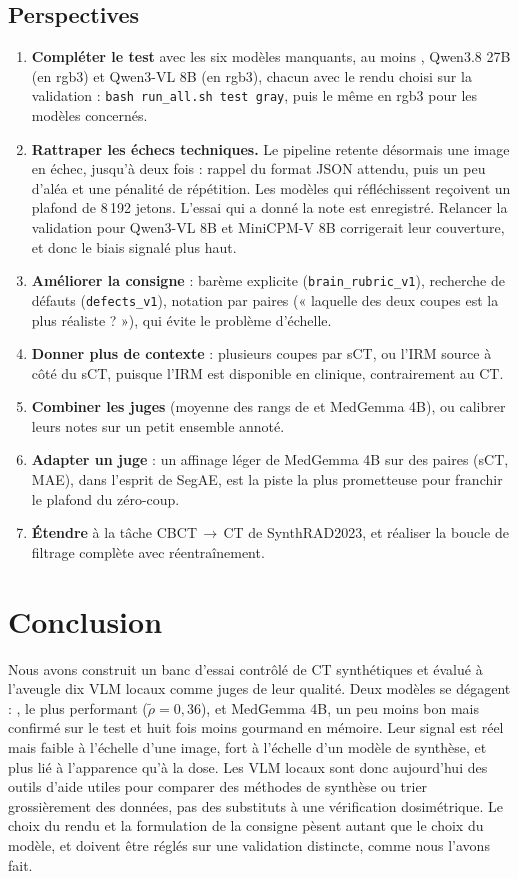 \documentclass[11pt,a4paper]{article}
\newcommand{\rhot}{\tilde{\rho}}
\begin{document}
\subsection{Perspectives}
\label{sec:perspectives}
\begin{enumerate}
  \item \textbf{Compléter le test} avec les six modèles manquants, au moins \bestVal{}, Qwen3.8 27B (en rgb3) et Qwen3-VL 8B (en rgb3), chacun avec le rendu choisi sur la validation : \texttt{bash run\_all.sh test gray}, puis le même en rgb3 pour les modèles concernés.
  \item \textbf{Rattraper les échecs techniques.} Le pipeline retente désormais une image en échec, jusqu'à deux fois : rappel du format JSON attendu, puis un peu d'aléa et une pénalité de répétition. Les modèles qui réfléchissent reçoivent un plafond de 8\,192 jetons. L'essai qui a donné la note est enregistré. Relancer la validation pour Qwen3-VL 8B et MiniCPM-V 8B corrigerait leur couverture, et donc le biais signalé plus haut.
  \item \textbf{Améliorer la consigne} : barème explicite (\texttt{brain\_rubric\_v1}), recherche de défauts (\texttt{defects\_v1}), notation par paires (« laquelle des deux coupes est la plus réaliste ? »), qui évite le problème d'échelle.
  \item \textbf{Donner plus de contexte} : plusieurs coupes par sCT, ou l'IRM source à côté du sCT, puisque l'IRM est disponible en clinique, contrairement au CT.
  \item \textbf{Combiner les juges} (moyenne des rangs de \bestVal{} et MedGemma 4B), ou calibrer leurs notes sur un petit ensemble annoté.
  \item \textbf{Adapter un juge} : un affinage léger de MedGemma 4B sur des paires (sCT, MAE), dans l'esprit de SegAE, est la piste la plus prometteuse pour franchir le plafond du zéro-coup.
  \item \textbf{Étendre} à la tâche CBCT\,$\rightarrow$\,CT de SynthRAD2023, et réaliser la boucle de filtrage complète avec réentraînement.
\end{enumerate}

\section{Conclusion}
Nous avons construit un banc d'essai contrôlé de CT synthétiques et évalué à l'aveugle dix VLM locaux comme juges de leur qualité. Deux modèles se dégagent : \bestVal{}, le plus performant ($\rhot = 0{,}36$), et MedGemma 4B, un peu moins bon mais confirmé sur le test et huit fois moins gourmand en mémoire. Leur signal est réel mais faible à l'échelle d'une image, fort à l'échelle d'un modèle de synthèse, et plus lié à l'apparence qu'à la dose. Les VLM locaux sont donc aujourd'hui des outils d'aide utiles pour comparer des méthodes de synthèse ou trier grossièrement des données, pas des substituts à une vérification dosimétrique. Le choix du rendu et la formulation de la consigne pèsent autant que le choix du modèle, et doivent être réglés sur une validation distincte, comme nous l'avons fait.
\end{document}
